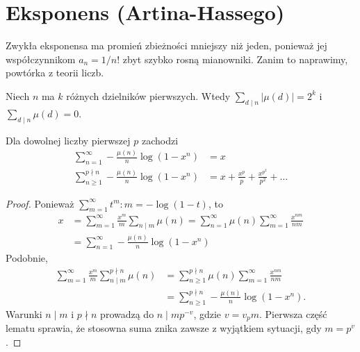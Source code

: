 \section{Eksponens (Artina-Hassego)}
Zwykła eksponensa ma promień zbieżności mniejszy niż jeden, ponieważ jej współczynnikom $a_n = 1/n!$ zbyt  szybko rosną mianowniki.
Zanim to naprawimy, powtórka z teorii liczb.

\begin{lemat}
	Niech $n$ ma $k$ różnych dzielników pierwszych.
	Wtedy $\sum_{d \mid n} |\mu(d)| = 2^k$ i $\sum_{d \mid n} \mu (d) = 0$.
\end{lemat}

\begin{fakt}
	Dla dowolnej liczby pierwszej $p$ zachodzi
	\begin{align*}
		\sum_{n=1}^\infty - \frac{\mu(n)}{n} \log(1-x^n) & = x \\
		\sum_{n \ge 1}^{p \nmid n}  - \frac{\mu(n)}{n} \log(1-x^n) & = x + \frac{x^p}{p} + \frac{x^{p^2}}{p^2} + \dots
	\end{align*}
\end{fakt}

\begin{proof}
	Ponieważ $\sum_{m=1}^\infty t^m : m = -\log(1-t)$, to
	\begin{align*}
		x & = \sum_{m = 1}^\infty \frac{x^m}{m} \sum_{n \mid m} \mu (n) = \sum_{n = 1}^\infty \mu(n) \sum_{m=1}^\infty \frac{x^{nm}}{nm} \\
		& = \sum_{n = 1}^\infty - \frac{\mu(n)}{n} \log(1-x^n)
	\end{align*}
	Podobnie,
	\begin{align*}
		\sum_{m = 1}^\infty \frac{x^m}{m} \sum_{n \mid m}^{p \nmid n} \mu (n) & = \sum_{n\ge 1}^{p \nmid n} \mu(n) \sum_{m=1}^\infty \frac{x^{nm}}{nm} \\
		& = \sum_{n \ge 1}^{p \nmid n} - \frac{\mu(n)}{n} \log(1-x^n).
	\end{align*}
	Warunki $n \mid m$ i $p \nmid n$ prowadzą do $n \mid mp^{-v}$, gdzie $v = v_pm$.
	Pierwsza część lematu sprawia, że stosowna suma znika zawsze z wyjątkiem sytuacji, gdy $m = p^v$.
\end{proof}



